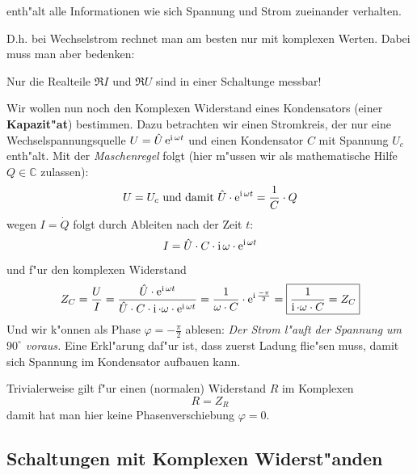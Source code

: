 \begin{Wichtig}
[\index{Komplexer Widerstand}Der Komplexe Widerstand $Z = \frac{U}{L}$] enth"alt alle
   Informationen wie sich Spannung und Strom zueinander verhalten.
\end{Wichtig}
D.h. bei Wechselstrom rechnet man am besten nur mit komplexen
Werten. Dabei muss man aber bedenken:
\begin{Wichtig}
    Nur die Realteile $\Re I$ und $\Re U$ sind in
   einer Schaltunge messbar!
\end{Wichtig}


\abs 
Wir wollen nun noch den Komplexen Widerstand eines Kondensators
(einer \textbf{Kapazit"at}) bestimmen. Dazu
betrachten wir einen Stromkreis, der nur eine Wechselspannungsquelle
$U = \hat U \operatorname{e}^{\operatorname{i} \omega t}$ und einen Kondensator $C$ mit Spannung
$U_c$ enth"alt. Mit der \emph{Maschenregel} folgt (hier m"ussen wir
als mathematische Hilfe $Q \in \mathbb C$ zulassen):
\begin{equation}
   \label{eq:357}
   U = U_c \text{ und damit } \hat U \cdot \operatorname{e}^{\operatorname{i} \omega t} =
   \frac{1}{C} \cdot Q
\end{equation}
wegen $I = \dot Q$ folgt durch Ableiten nach der Zeit $t$:
\begin{equation}
   \label{eq:358}
   I = \hat U \cdot C  \cdot \operatorname{i} \omega \cdot \operatorname{e}^{\operatorname{i}\omega t}
\end{equation}
und f"ur den komplexen Widerstand
\begin{equation}
   \label{eqn_kompl_wiederst_kondens}
   Z_C = \frac{U}{I} = \frac{\hat U \cdot \operatorname{e}^{\operatorname{i} \omega t}}{\hat U
     \cdot C \cdot \operatorname{i} \cdot  \omega \cdot \operatorname{e}^{\operatorname{i}\omega t}} =
\frac{1}{\omega \cdot C} \cdot \operatorname{e}^{\operatorname{i} \frac{-\pi}{2}} =\boxed{   \frac{1}{\operatorname{i} \cdot \omega \cdot C} = Z_C}
\end{equation}
Und wir k"onnen als Phase $\varphi = -\frac{\pi}{2}$ ablesen: \emph{Der
  Strom l"auft der Spannung um $90^\circ$ voraus.} Eine Erkl"arung daf"ur
ist, dass zuerst Ladung flie"sen muss, damit sich Spannung im
Kondensator aufbauen kann.


\abs
Trivialerweise gilt f"ur einen (normalen) Widerstand $R$ im Komplexen
\begin{equation}
   \label{eqn_kompl_widerst_widerst}
   \boxed{ R = Z_R }
\end{equation}
damit hat man hier keine Phasenverschiebung $\varphi = 0$.





\subsection{Schaltungen mit Komplexen Widerst"anden}
\label{kap_schaltungen-mit-komplexen-widerstanden}

